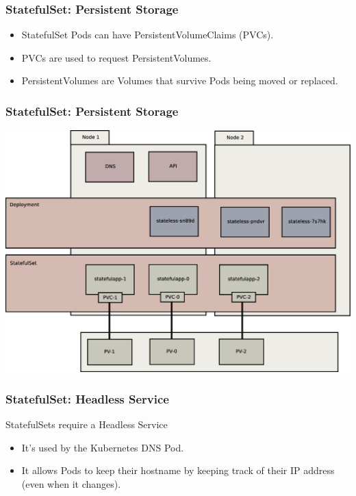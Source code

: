     \begin{frame}
        \frametitle{StatefulSet: Persistent Storage}
        \begin{itemize}
            \item StatefulSet Pods can have PersistentVolumeClaims (PVCs).\pause
            \item PVCs are used to request PersistentVolumes.\pause
            \item PersistentVolumes are Volumes that survive Pods being moved or replaced.
        \end{itemize}
    \end{frame}

    \begin{frame}
        \frametitle{StatefulSet: Persistent Storage}
        \includegraphics[width=\textwidth,height=0.85\textheight,keepaspectratio]{graphics/06-persistence.eps}
    \end{frame}

    \begin{frame}
        \frametitle{StatefulSet: Headless Service}
        StatefulSets require a Headless Service
        \begin{itemize}
            \item It's used by the Kubernetes DNS Pod.\pause
            \item It allows Pods to keep their hostname by keeping track of their IP address (even when it changes).
        \end{itemize}
    \end{frame}

